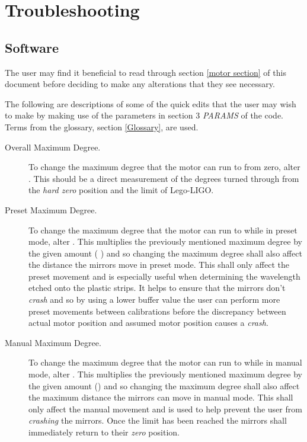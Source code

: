 \documentclass[a4paper, 12pt]{book}
\begin{document}
\section{Troubleshooting}
\subsection{Software}
\label{software edits}
The user may find it beneficial to read through section \ref{motor section} of this document before deciding to make any alterations that they see necessary.

The following are descriptions of some of the quick edits that the user may wish to make by making use of the parameters in section 3 \textit{PARAMS} of the code. Terms from the glossary, section \ref{Glossary}, are used.

\begin{description}
\item [Overall Maximum Degree.] To change the maximum degree that the motor can run to from zero, alter . This should be a direct measurement of the degrees turned through from the \textit{hard zero} position and the limit of Lego-LIGO.

\item [Preset Maximum Degree.] To change the maximum degree that the motor can run to while in preset mode, alter . This multiplies the previously mentioned maximum degree by the given amount ( ) and so changing the maximum degree shall also affect the distance the mirrors move in preset mode. This shall only affect the preset movement and is especially useful when determining the wavelength etched onto the plastic strips. It helps to ensure that the mirrors don't \textit{crash} and so by using a lower buffer value the user can perform more preset movements between calibrations before the discrepancy between actual motor position and assumed motor position causes a \textit{crash}.

\item [Manual Maximum Degree.] To change the maximum degree that the motor can run to while in manual mode, alter . This multiplies the previously mentioned maximum degree by the given amount () and so changing the maximum degree shall also affect the maximum distance the mirrors can move in manual mode. This shall only affect the manual movement and is used to help prevent the user from \textit{crashing} the mirrors. Once the limit has been reached the mirrors shall immediately return to their \textit{zero} position.


\end{description}
\end{document}
